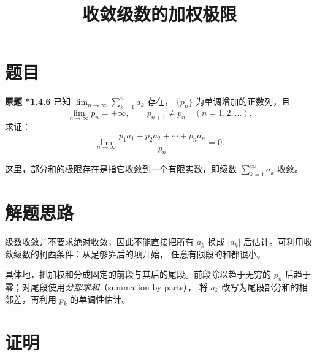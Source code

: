 \documentclass[UTF8,12pt,a4paper,fontset=fandol]{ctexart}
\title{收敛级数的加权极限}
\author{}
\date{}
\begin{document}
\maketitle

\section{题目}

\textbf{原题 *1.4.6}\quad
已知 $\displaystyle\lim_{n\to\infty}\sum_{k=1}^{n}a_k$ 存在，
$\{p_n\}$ 为单调增加的正数列，且
\[
  \lim_{n\to\infty}p_n=+\infty,
  \qquad p_{n+1}\ne p_n\quad(n=1,2,\ldots).
\]
求证：
\begin{equation}\label{eq:weighted-limit}
  \lim_{n\to\infty}
  \frac{p_1a_1+p_2a_2+\cdots+p_na_n}{p_n}=0.
\end{equation}

这里，部分和的极限存在是指它收敛到一个有限实数，即级数
$\sum_{k=1}^{\infty}a_k$ 收敛。

\section{解题思路}

级数收敛并不要求绝对收敛，因此不能直接把所有 $a_k$ 换成
$|a_k|$ 后估计。可利用收敛级数的柯西条件：从足够靠后的项开始，
任意有限段的和都很小。

具体地，把加权和分成固定的前段与其后的尾段。前段除以趋于无穷的
$p_n$ 后趋于零；对尾段使用\emph{分部求和}（summation by parts），
将 $a_k$ 改写为尾段部分和的相邻差，再利用 $p_k$ 的单调性估计。

\section{证明}
\end{document}
